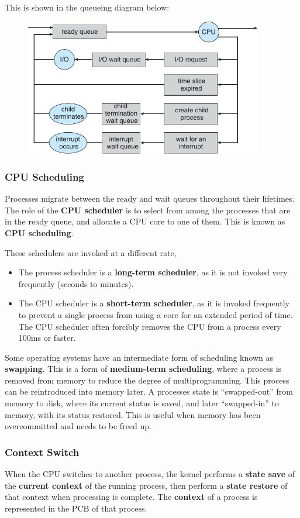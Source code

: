 \documentclass{article}
\begin{document}
This is shown in the queueing diagram below:
\begin{figure}[H]
    \centering
    \includegraphics[height = 6cm]{figures/queueing_diagram}
\end{figure}
\subsubsection{CPU Scheduling}
Processes migrate between the ready and wait queues throughout their
lifetimes. The role of the \textbf{CPU scheduler} is to select from
among the processes that are in the ready queue, and allocate a CPU
core to one of them. This is known as \textbf{CPU scheduling}.

These schedulers are invoked at a different rate,
\begin{itemize}
    \item The process scheduler is a \textbf{long-term scheduler}, as
          it is not invoked very frequently (seconds to minutes).
    \item The CPU scheduler is a \textbf{short-term scheduler}, as it
          is invoked frequently to prevent a single process from using
          a core for an extended period of time. The CPU scheduler
          often forcibly removes the CPU from a process every 100ms or
          faster.
\end{itemize}
Some operating systems have an intermediate form of scheduling known
as \textbf{swapping}.
This is a form of \textbf{medium-term scheduling}, where a process is
removed from memory to reduce the degree of multiprogramming.
This process can be reintroduced into memory later.
A processes state is ``swapped-out'' from memory to disk, where its
current status is saved, and later ``swapped-in'' to memory, with its
status restored.
This is useful when memory has been overcommitted and needs to be freed
up.
\subsubsection{Context Switch}
When the CPU switches to another process, the kernel performs a
\textbf{state save} of the \textbf{current context} of the running
process, then perform a \textbf{state restore} of that context when
processing is complete. The \textbf{context} of a process is
represented in the PCB of that process.
\end{document}
